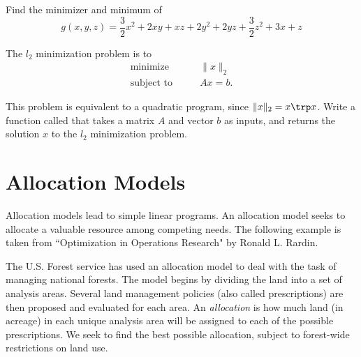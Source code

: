 \begin{problem}
Find the minimizer and minimum of
\begin{equation*}
g(x,y,z) = \frac{3}{2}x^2 +2xy + xz+ 2y^2 +2yz+\frac{3}{2}z^2+3x + z
\end{equation*}
\begin{comment}
\begin{equation}
f(x) = \frac{1}{2}x\trp Qx - x\trp p
\end{equation}
where

\begin{center}
$Q =
\begin{bmatrix}
3 & 2 & 1\\
2 & 4 & 2\\
1 & 2 & 3\\
\end{bmatrix}
$
and $p =
\begin{bmatrix}
3\\
0\\
1\\
\end{bmatrix}
$
\end{center}
\end{comment}

\end{problem}


\begin{problem}
The $l_2$ minimization problem is to
\begin{align*}
\text{minimize}\qquad &\|x\|_2\\
\text{subject to} \qquad &Ax = b.
\end{align*}

This problem is equivalent to a quadratic program, since $\|x\|_2 = x\trp x$.
Write a function called  that takes a matrix $A$ and vector $b$ as inputs, and returns the solution $x$ to the $l_2$ minimization problem.
\end{problem}

\section*{Allocation Models}
Allocation models lead to simple linear programs. An allocation model seeks to allocate a valuable resource among competing needs. The following example is taken from ``Optimization in Operations Research" by Ronald L. Rardin. %

The U.S. Forest service has used an allocation model to deal with the task of managing national forests. 
The model begins by dividing the land into a set of analysis areas. Several land management policies (also 
called prescriptions) are then proposed and evaluated for each area. 
An \emph{allocation} is how much land (in acreage) in each unique analysis area will be assigned to each of the possible prescriptions.
We seek to find the best possible allocation, subject to forest-wide restrictions on land use.

